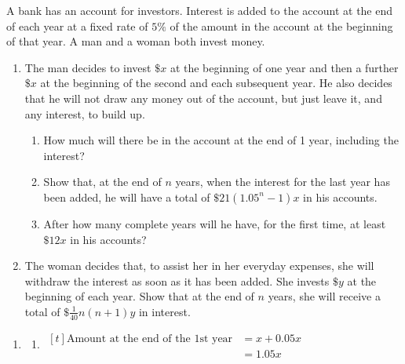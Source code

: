 \documentclass[11pt,a4paper]{book}
\begin{document}
\begin{example}

A bank has an account for investors. Interest is added to the account
at the end of each year at a fixed rate of $5\%$ of the amount in
the account at the beginning of that year. A man and a woman both
invest money.

\begin{enumerate}[label=(\alph*)]

\item  The man decides to invest $\$x$ at the beginning of one year
and then a further $\$x$ at the beginning of the second and each
subsequent year. He also decides that he will not draw any money out
of the account, but just leave it, and any interest, to build up.

\begin{enumerate}[label=(\roman*)]

\item  How much will there be in the account at the end of 1 year,
including the interest?

\item  Show that, at the end of $n$ years, when the interest for
the last year has been added, he will have a total of $\$21\left(1.05^{n}-1\right)x$
in his accounts.

\item  After how many complete years will he have, for the first
time, at least $\$12x$ in his accounts?

\end{enumerate}

\item  The woman decides that, to assist her in her everyday expenses,
she will withdraw the interest as soon as it has been added. She invests $\$y$ at the beginning of each year. Show that at the end of $n$ years, she will receive a total of ${\displaystyle \$\frac{1}{40}n\left(n+1\right)y}$ in interest.

\end{enumerate}

\Solution

\begin{enumerate}[label=(\alph*)]

\item

\begin{enumerate}[label=(\roman*)]

\item
$
\begin{aligned}[t]
\text{Amount at the end of the 1st year} & =x+0.05x\\
 & =1.05x
\end{aligned}
$


\end{enumerate}
\end{enumerate}
\end{example}
\end{document}
